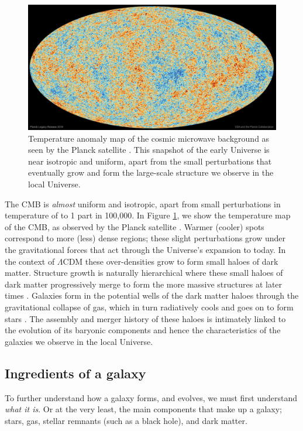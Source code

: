 \begin{figure}
	\includegraphics[width=\linewidth]{thesis/latex/introduction/planck_cmb_2018.jpg}
    \caption{Temperature anomaly map of the cosmic microwave background as seen by the Planck satellite \citep{planck2018i}. This snapshot of the early Universe is near isotropic and uniform, apart from the small perturbations that eventually grow and form the large-scale structure we observe in the local Universe.}
    \label{fig:cmb_planck}
\end{figure}

The CMB is \textit{almost} uniform and isotropic, apart from small perturbations in temperature of to 1 part in 100,000. In Figure \ref{fig:cmb_planck}, we show the temperature map of the CMB, as observed by the Planck satellite \citep{planck2018i}. Warmer (cooler) spots correspond to more (less) dense regions; these slight perturbations grow under the gravitational forces that act through the Universe's expansion to today. In the context of $\Lambda$CDM these over-densities grow to form small haloes of dark matter. Structure growth is naturally hierarchical where these small haloes of dark matter progressively merge to form the more massive structures at later times \citep{press1974}. Galaxies form in the potential wells of the dark matter haloes through the gravitational collapse of gas, which in turn radiatively cools and goes on to form stars \citep{white1978}. The assembly and merger history of these haloes is intimately linked to the evolution of its baryonic components and hence the characteristics of the galaxies we observe in the local Universe.

\subsection{Ingredients of a galaxy}
To further understand how a galaxy forms, and evolves, we must first understand \textit{what it is}. Or at the very least, the main components that make up a galaxy; stars, gas, stellar remnants (such as a black hole), and dark matter. 

